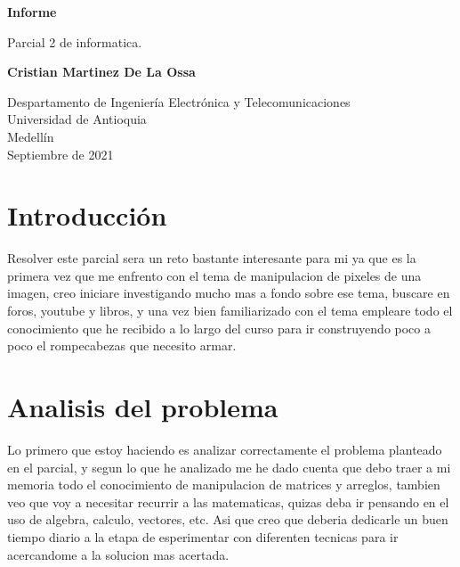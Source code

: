 \documentclass{article}
\begin{document}
\begin{titlepage}
    \begin{center}
        \vspace*{1cm}
            
        \Huge
        \textbf{Informe}
            
        \vspace{0.5cm}
        \LARGE
        Parcial 2 de informatica.
            
        \vspace{1.5cm}
            
        \text
        
        
        \textbf{Cristian Martinez De La Ossa}
        
            
        \vfill
            
        \vspace{0.8cm}
            
        \Large
        Despartamento de Ingeniería Electrónica y Telecomunicaciones\\
        Universidad de Antioquia\\
        Medellín\\
        Septiembre de 2021
            
    \end{center}
\end{titlepage}

\tableofcontents
\newpage
\section{Introducción}\label{intro}
Resolver este parcial sera un reto bastante interesante para mi ya que es la primera vez que me enfrento con el tema de manipulacion de pixeles de una imagen, creo iniciare investigando mucho mas a fondo sobre ese tema, buscare en foros, youtube y libros, y una vez bien familiarizado con el tema empleare todo el conocimiento que he recibido a lo largo del curso para ir construyendo poco a poco el rompecabezas que necesito armar.


\section{Analisis del problema} \label{contenido}
Lo primero que estoy haciendo es analizar correctamente el problema planteado en el parcial, y segun lo que he analizado me he dado cuenta que debo traer a mi memoria todo el conocimiento de manipulacion de matrices y arreglos, tambien veo que voy a necesitar recurrir a las matematicas, quizas deba ir pensando en el uso de algebra, calculo, vectores, etc.
Asi que creo que deberia dedicarle un buen tiempo diario a la etapa de esperimentar con diferenten tecnicas para ir acercandome a la solucion mas acertada.
\end{document}
